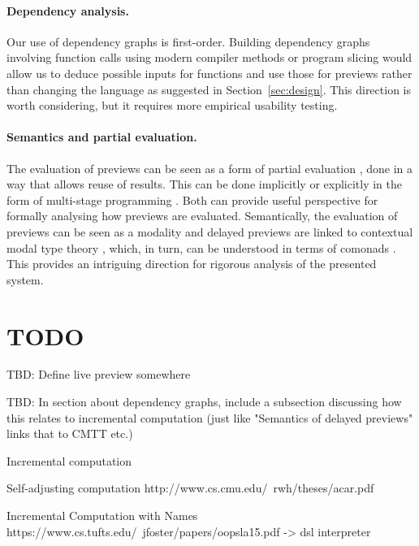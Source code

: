 \documentclass[acmsmall,anonymous,fleqn]{acmart}\settopmatter{printfolios=false,printccs=false,printacmref=false}
\theoremstyle{plain}
\theoremstyle{definition}
\begin{document}
\paragraph{Dependency analysis.}
Our use of dependency graphs \cite{dependencies} is first-order. Building dependency graphs
involving function calls using modern compiler methods \cite{optimizing} or program slicing
\cite{slicing} would allow us to deduce possible inputs for functions and use those for
previews rather than changing the language as suggested in Section~\ref{sec:design}. This direction
is worth considering, but it requires more empirical usability testing.

\paragraph{Semantics and partial evaluation.}
The evaluation of previews can be seen as a form of partial evaluation \cite{partial}, done in a
way that allows reuse of results. This can be done implicitly or explicitly in the form of
multi-stage programming \cite{metaml}. Both can provide useful perspective for formally analysing
how previews are evaluated. Semantically, the evaluation of previews can be seen as a modality
\cite{modal} and delayed previews are linked to contextual modal type theory \cite{cmtt}, which,
in turn, can be understood in terms of comonads \cite{cmtt-denotation}. This provides an intriguing
direction for rigorous analysis of the presented system.


\section{TODO}

TBD: Define live preview somewhere

TBD: In section about dependency graphs, include a subsection discussing how this relates
to incremental computation (just like "Semantics of delayed previews" links that to CMTT etc.)


\cite{selfadjusting}
\cite{incremental}

Incremental computation

  Self-adjusting computation
  http://www.cs.cmu.edu/~rwh/theses/acar.pdf

  Incremental Computation with Names
  https://www.cs.tufts.edu/~jfoster/papers/oopsla15.pdf
  -> dsl interpreter
\end{document}
